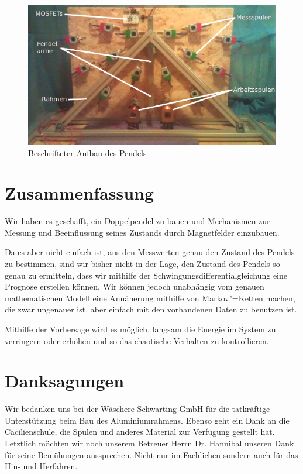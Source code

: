 \documentclass[a4paper, 10pt]{article}
\begin{document}
\begin{figure}[bht]
  \includegraphics[width=\textwidth]{images/real_front_text_white.jpg}
  \caption{Beschrifteter Aufbau des Pendels}
  \label{fig:aufbaubeschriftet}
\end{figure}





\section{Zusammenfassung}
Wir haben es geschafft, ein Doppelpendel zu bauen und Mechanismen zur Messung und Beeinflussung seines
Zustands durch Magnetfelder einzubauen.

Da es aber nicht einfach ist, aus den Messwerten genau den
Zustand des Pendels zu bestimmen, sind wir bisher nicht in der Lage, den Zustand des Pendels so genau
zu ermitteln, dass wir mithilfe der Schwingungsdifferentialgleichung eine Prognose erstellen können. Wir
können jedoch unabhängig vom genauen mathematischen Modell eine Annäherung mithilfe von Markov"=Ketten machen, die zwar ungenauer ist, aber einfach mit den vorhandenen Daten zu benutzen ist.

Mithilfe der Vorhersage wird es möglich, langsam die Energie im System zu verringern oder erhöhen und so das chaotische Verhalten zu kontrollieren.

\section*{Danksagungen}

Wir bedanken uns bei der Wäschere Schwarting GmbH für die tatkräftige Unterstützung beim Bau des Aluminiumrahmens.
Ebenso geht ein Dank an die Cäcilienschule, die Spulen und anderes Material zur Verfügung gestellt hat.
Letztlich möchten wir noch unserem Betreuer Herrn Dr. Hannibal unseren Dank für seine Bemühungen aussprechen.
Nicht nur im Fachlichen sondern auch für das Hin- und Herfahren.


{}
\end{document}

